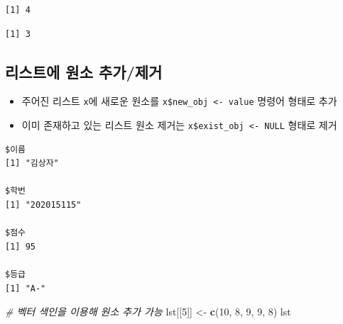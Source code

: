 \documentclass[
  11pt,
]{krantz}
\newenvironment{Shaded}{\begin{snugshade}}{\end{snugshade}}
\newcommand{\CommentTok}[1]{\textcolor[rgb]{0.37,0.37,0.37}{\textit{#1}}}
\newcommand{\DecValTok}[1]{\textcolor[rgb]{0.06,0.06,0.06}{#1}}
\newcommand{\KeywordTok}[1]{\textcolor[rgb]{0.27,0.27,0.27}{\textbf{#1}}}
\newcommand{\NormalTok}[1]{#1}
\newcommand{\OperatorTok}[1]{\textcolor[rgb]{0.43,0.43,0.43}{\textbf{#1}}}
\newcommand{\OtherTok}[1]{\textcolor[rgb]{0.37,0.37,0.37}{#1}}
\newcommand{\StringTok}[1]{\textcolor[rgb]{0.5,0.5,0.5}{#1}}
\providecommand{\tightlist}{%
  \setlength{\itemsep}{0pt}\setlength{\parskip}{0pt}}
\begin{document}
\begin{verbatim}
[1] 4
\end{verbatim}

\begin{verbatim}
[1] 3
\end{verbatim}

\normalsize

\hypertarget{list-add-delete}{%
\subsection{리스트에 원소 추가/제거}\label{list-add-delete}}

\begin{itemize}
\tightlist
\item
  주어진 리스트 \texttt{x}에 새로운 원소를 \texttt{x\$new\_obj\ \textless{}-\ value} 명령어 형태로 추가
\item
  이미 존재하고 있는 리스트 원소 제거는 \texttt{x\$exist\_obj\ \textless{}-\ NULL} 형태로 제거
\end{itemize}

\footnotesize

\begin{Shaded}
\end{Shaded}

\begin{verbatim}
$이름
[1] "김상자"

$학번
[1] "202015115"

$점수
[1] 95

$등급
[1] "A-"
\end{verbatim}

\begin{Shaded}
\begin{Highlighting}[]
\CommentTok{# 벡터 색인을 이용해 원소 추가 가능}
\NormalTok{lst[[}\DecValTok{5}\NormalTok{]] <-}\StringTok{ }\KeywordTok{c}\NormalTok{(}\DecValTok{10}\NormalTok{, }\DecValTok{8}\NormalTok{, }\DecValTok{9}\NormalTok{, }\DecValTok{9}\NormalTok{, }\DecValTok{8}\NormalTok{)}
\NormalTok{lst}
\end{Highlighting}
\end{Shaded}
\end{document}

